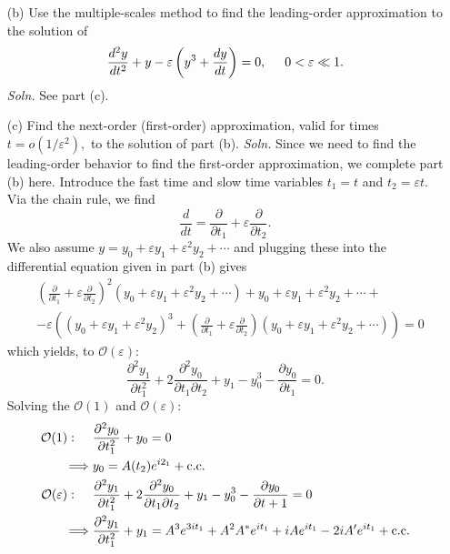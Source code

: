 \documentclass{article}
\begin{document}
\begin{itemize}
    \item[(b)] Use the multiple-scales method to find the leading-order approximation to the solution of 
    \[\frac{d^2y}{dt^2} + y -\varepsilon\left(y^3 + \frac{dy}{dt}\right) = 0, \hspace{0.5cm} 0 < \varepsilon \ll 1.\]
    \textit{Soln.} See part (c).

    \item[(c)] Find the next-order (first-order) approximation, valid for times $t = o(1/\varepsilon^2),$ to the solution of part (b).
    \newline\newline
    \textit{Soln.} Since we need to find the leading-order behavior to find the first-order approximation, we complete part (b) here. Introduce the fast time and slow time variables $t_1 = t$ and $t_2 = \varepsilon t$. Via the chain rule, we find
    \[\frac{d}{dt} = \frac{\partial}{\partial t_1} + \varepsilon\frac{\partial}{\partial t_2}.\]
    We also assume $y = y_0 + \varepsilon y_1 + \varepsilon^2 y_2 + \cdots$ and plugging these into the differential equation given in part (b) gives
    \begin{align*}
        &\left(\frac{\partial}{\partial t_1} + \varepsilon\frac{\partial}{\partial t_2}\right)^2(y_0 + \varepsilon y_1 + \varepsilon^2y_2 + \cdots) + y_0 + \varepsilon y_1 + \varepsilon^2y_2 + \cdots +\\
        &-\varepsilon\left((y_0 + \varepsilon y_1 + \varepsilon^2y_2)^3 + \left(\frac{\partial}{\partial t_1} + \varepsilon\frac{\partial}{\partial t_2}\right)(y_0 + \varepsilon y_1 + \varepsilon^2y_2 + \cdots)\right) = 0
    \end{align*}
    which yields, to $\mathcal{O}(\varepsilon)$:
    \[\frac{\partial^2y_1}{\partial t_1^2} + 2\frac{\partial^2y_0}{\partial t_1\partial t_2} + y_1 - y_0^3 - \frac{\partial y_0}{\partial t_1} = 0.\]
    Solving the $\mathcal{O}(1)$ and $\mathcal{O}(\varepsilon)$:
    \begin{align*}
        \mathcal{O}(1): \hspace{0.5cm} &\frac{\partial^2y_0}{\partial t_1^2} + y_0 = 0\\
        \implies &y_0 = A(t_2)e^{i2_1} + \text{c.c.}\\
        \mathcal{O}(\varepsilon): \hspace{0.5cm} &\frac{\partial^2y_1}{\partial t_1^2} + 2\frac{\partial^2y_0}{\partial t_1\partial t_2} + y_1 - y_0^3 - \frac{\partial y_0}{\partial t+1} = 0\\
        \implies &\frac{\partial^2y_1}{\partial t_1^2} + y_1 = A^3e^{3it_1} + A^2A^*e^{it_1} + iAe^{it_1} - 2iA'e^{it_1} + \text{c.c.}

\end{align*}
\end{itemize}
\end{document}
